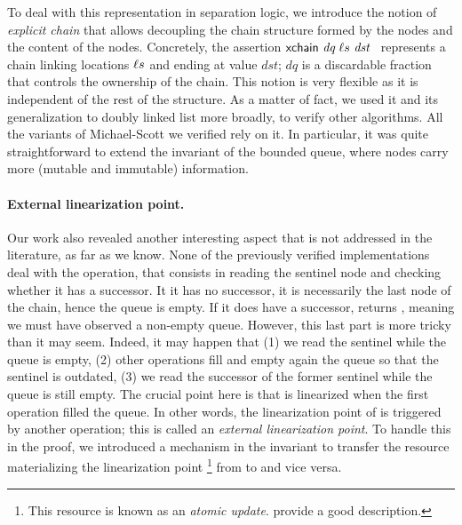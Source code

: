 To deal with this representation in separation logic, we introduce the notion of \emph{explicit chain} that allows decoupling the chain structure formed by the nodes and the content of the nodes.
Concretely, the assertion $\textlog{xchain}\ \textit{dq}\ \loc{}s\ \textit{dst}$~ represents a chain linking locations $\ell{}s$ and ending at value $\textit{dst}$; $\textit{dq}$ is a discardable fraction~\citep*{DBLP:conf/cpp/VindumB21} that controls the ownership of the chain.
This notion is very flexible as it is independent of the rest of the structure.
As a matter of fact, we used it and its generalization to doubly linked list more broadly, to verify other algorithms.
All the variants of Michael-Scott we verified rely on it.
In particular, it was quite straightforward to extend the invariant of the bounded queue, where nodes carry more (mutable and immutable) information.

\paragraph{External linearization point.}
Our work also revealed another interesting aspect that is not addressed in the literature, as far as we know.
None of the previously verified implementations deal with the  operation, that consists in reading the sentinel node and checking whether it has a successor.
It it has no successor, it is necessarily the last node of the chain, hence the queue is empty.
If it does have a successor,  returns , meaning we must have observed a non-empty queue.
However, this last part is more tricky than it may seem.
Indeed, it may happen that (1) we read the sentinel while the queue is empty, (2) other operations fill and empty again the queue so that the sentinel is outdated, (3) we read the successor of the former sentinel while the queue is still empty.
The crucial point here is that  is linearized when the first  operation filled the queue.
In other words, the linearization point of  is triggered by another operation; this is called an \emph{external linearization point}.
To handle this in the proof, we introduced a mechanism in the invariant to transfer the \Iris resource materializing the linearization point%
\footnote{
This resource is known as an \emph{atomic update}.
\citet*{DBLP:journals/pacmpl/MulderK23} provide a good description.
}
from  to  and vice versa.

